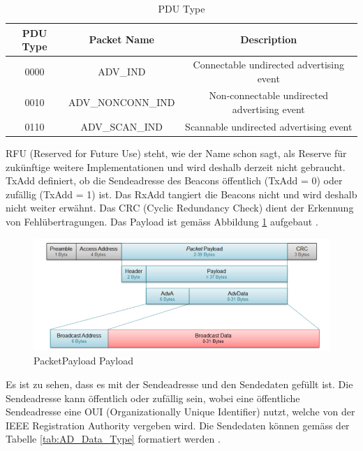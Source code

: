 \begin{table}[htbp!!!]
	\begin{center}
\begin{tabular}{|c|c|c|}
\hline 
\rule[-1ex]{0pt}{2.5ex} PDU Type & Packet Name & Description \\ 
\hline 
\rule[-1ex]{0pt}{2.5ex} 0000 & ADV{\_}IND & Connectable undirected advertising event \\ 
\hline 
\rule[-1ex]{0pt}{2.5ex} 0010 & ADV{\_}NONCONN{\_}IND & Non-connectable undirected advertising event \\ 
\hline 
\rule[-1ex]{0pt}{2.5ex} 0110 & ADV{\_}SCAN{\_}IND & Scannable undirected advertising event \\ 
\hline 
\end{tabular} 
\caption[PDU Type \cite{9_Teildokument_BT}]{PDU Type}
\label{tab:PDU}
\end{center}
\end{table}

RFU (Reserved for Future Use) steht, wie der Name schon sagt, als Reserve für zukünftige weitere Implementationen und wird deshalb derzeit nicht gebraucht. TxAdd definiert, ob die Sendeadresse des Beacons öffentlich (TxAdd = 0) oder zufällig (TxAdd = 1) ist. Das RxAdd tangiert die Beacons nicht und wird deshalb nicht weiter erwähnt. Das CRC (Cyclic Redundancy Check) dient der Erkennung von Fehlübertragungen. Das Payload ist gemäss Abbildung \ref{fig:PacketPayload_Payload} aufgebaut \cite{9_Teildokument_BT}.

\begin{figure}[htbp!!!!]
	\begin{center}
		\includegraphics[width=\textwidth]{data/PacketPayload_Payload.png}
		\caption[PacketPayload Payload \cite{9_Teildokument_BT}]{PacketPayload Payload} %
		\label{fig:PacketPayload_Payload}
	\end{center}
\end{figure}

Es ist zu sehen, dass es mit der Sendeadresse und den Sendedaten gefüllt ist. Die Sendeadresse kann öffentlich oder zufällig sein, wobei eine öffentliche Sendeadresse eine OUI (Organizationally Unique Identifier) nutzt, welche von der IEEE Registration Authority vergeben wird. Die Sendedaten können gemäss der  Tabelle \ref{tab:AD_Data_Type} formatiert werden \cite{9_Teildokument_BT}.

